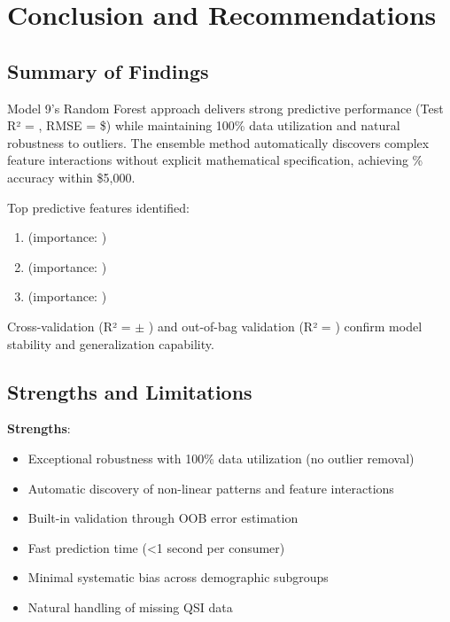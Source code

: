 \section{Conclusion and Recommendations}

\subsection{Summary of Findings}

Model 9's Random Forest approach delivers strong predictive performance (Test R² = \ModelNineRSquaredTest{}, RMSE = \$\ModelNineRMSETest{}) while maintaining 100\% data utilization and natural robustness to outliers. The ensemble method automatically discovers complex feature interactions without explicit mathematical specification, achieving \ModelNineWithinFiveK{}\% accuracy within \$5,000.

Top predictive features identified:
\begin{enumerate}
    \item \ModelNineTopFeatureOne{} (importance: \ModelNineTopFeatureOneImportance{})
    \item \ModelNineTopFeatureTwo{} (importance: \ModelNineTopFeatureTwoImportance{})
    \item \ModelNineTopFeatureThree{} (importance: \ModelNineTopFeatureThreeImportance{})
\end{enumerate}

Cross-validation (R² = \ModelNineCVMean{} $\pm$ \ModelNineCVStd{}) and out-of-bag validation (R² = \ModelNineOOBRSquared{}) confirm model stability and generalization capability.

\subsection{Strengths and Limitations}

\textbf{Strengths}:
\begin{itemize}
    \item Exceptional robustness with 100\% data utilization (no outlier removal)
    \item Automatic discovery of non-linear patterns and feature interactions
    \item Built-in validation through OOB error estimation
    \item Fast prediction time (<1 second per consumer)
    \item Minimal systematic bias across demographic subgroups
    \item Natural handling of missing QSI data
\end{itemize}

